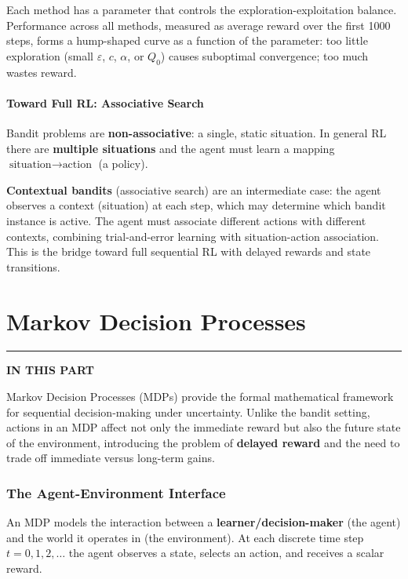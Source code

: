\documentclass[11pt,a4paper]{article}
\theoremstyle{definition}
\theoremstyle{plain}
\theoremstyle{remark}
\newcommand{\partmtoc}{%
  \vspace{2pt}%
  {\color{rlrule}\rule{\linewidth}{0.5pt}}\par\vspace{3pt}%
  {\footnotesize\bfseries\color{rlaccent}IN THIS PART}\par\vspace{2pt}%
  \begingroup
  \etocsetnexttocdepth{subsection}%
  \localtableofcontents
  \endgroup
  \vspace{2pt}{\color{rlrule}\rule{\linewidth}{0.5pt}}\par\vspace{10pt}}
\begin{document}
Each method has a parameter that controls the exploration-exploitation balance. Performance across all methods, measured as average reward over the first 1000 steps, forms a hump-shaped curve as a function of the parameter: too little exploration (small $\varepsilon$, $c$, $\alpha$, or $Q_0$) causes suboptimal convergence; too much wastes reward.

\subsection{Toward Full RL: Associative Search}

Bandit problems are \textbf{non-associative}: a single, static situation. In general RL there are \textbf{multiple situations} and the agent must learn a mapping $\text{situation} \to \text{action}$ (a policy).

\textbf{Contextual bandits} (associative search) are an intermediate case: the agent observes a context (situation) at each step, which may determine which bandit instance is active. The agent must associate different actions with different contexts, combining trial-and-error learning with situation-action association. This is the bridge toward full sequential RL with delayed rewards and state transitions.



\part{Markov Decision Processes}
\partmtoc

Markov Decision Processes (MDPs) provide the formal mathematical framework for sequential decision-making under uncertainty. Unlike the bandit setting, actions in an MDP affect not only the immediate reward but also the future state of the environment, introducing the problem of \textbf{delayed reward} and the need to trade off immediate versus long-term gains.

\section{The Agent-Environment Interface}

An MDP models the interaction between a \textbf{learner/decision-maker} (the agent) and the world it operates in (the environment). At each discrete time step $t = 0, 1, 2, \ldots$ the agent observes a state, selects an action, and receives a scalar reward.
\end{document}
